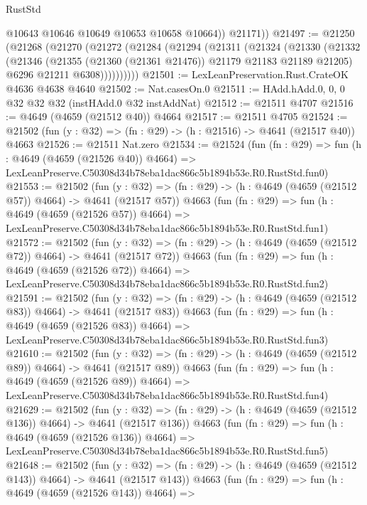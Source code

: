 \begin{lexlean}{RustStd}
\begin{coremodule}
            @10643
            @10646
            @10649
            @10653
            @10658
            @10664))
        @21171))
@21497 := @21250
    (@21268
      (@21270
        (@21272
          (@21284
            (@21294
              (@21311
                (@21324
                  (@21330
                    (@21332
                      (@21346
                        (@21355 (@21360 (@21361 @21476)) @21179 @21183 @21189 @21205)
                        @6296
                        @21211
                        @6308))))))))))
@21501 := LexLeanPreservation.Rust.CrateOK @4636 @4638 @4640
@21502 := Nat.casesOn.{0}
@21511 := HAdd.hAdd.{0, 0, 0} @32 @32 @32 (instHAdd.{0} @32 instAddNat)
@21512 := @21511 @4707
@21516 := @4649 (@4659 (@21512 @40)) @4664
@21517 := @21511 @4705
@21524 := @21502 (fun (y : @32) => (fn : @29) -> (h : @21516) -> @4641 (@21517 @40)) @4663
@21526 := @21511 Nat.zero
@21534 := @21524
    (fun (fn : @29) =>
    fun (h : @4649 (@4659 (@21526 @40)) @4664) =>
    LexLeanPreserve.C50308d34b78eba1dac866c5b1894b53e.R0.RustStd.fun0)
@21553 := @21502
    (fun (y : @32) => (fn : @29) -> (h : @4649 (@4659 (@21512 @57)) @4664) -> @4641 (@21517 @57))
    @4663
    (fun (fn : @29) =>
    fun (h : @4649 (@4659 (@21526 @57)) @4664) =>
    LexLeanPreserve.C50308d34b78eba1dac866c5b1894b53e.R0.RustStd.fun1)
@21572 := @21502
    (fun (y : @32) => (fn : @29) -> (h : @4649 (@4659 (@21512 @72)) @4664) -> @4641 (@21517 @72))
    @4663
    (fun (fn : @29) =>
    fun (h : @4649 (@4659 (@21526 @72)) @4664) =>
    LexLeanPreserve.C50308d34b78eba1dac866c5b1894b53e.R0.RustStd.fun2)
@21591 := @21502
    (fun (y : @32) => (fn : @29) -> (h : @4649 (@4659 (@21512 @83)) @4664) -> @4641 (@21517 @83))
    @4663
    (fun (fn : @29) =>
    fun (h : @4649 (@4659 (@21526 @83)) @4664) =>
    LexLeanPreserve.C50308d34b78eba1dac866c5b1894b53e.R0.RustStd.fun3)
@21610 := @21502
    (fun (y : @32) => (fn : @29) -> (h : @4649 (@4659 (@21512 @89)) @4664) -> @4641 (@21517 @89))
    @4663
    (fun (fn : @29) =>
    fun (h : @4649 (@4659 (@21526 @89)) @4664) =>
    LexLeanPreserve.C50308d34b78eba1dac866c5b1894b53e.R0.RustStd.fun4)
@21629 := @21502
    (fun (y : @32) => (fn : @29) -> (h : @4649 (@4659 (@21512 @136)) @4664) -> @4641 (@21517 @136))
    @4663
    (fun (fn : @29) =>
    fun (h : @4649 (@4659 (@21526 @136)) @4664) =>
    LexLeanPreserve.C50308d34b78eba1dac866c5b1894b53e.R0.RustStd.fun5)
@21648 := @21502
    (fun (y : @32) => (fn : @29) -> (h : @4649 (@4659 (@21512 @143)) @4664) -> @4641 (@21517 @143))
    @4663
    (fun (fn : @29) =>
    fun (h : @4649 (@4659 (@21526 @143)) @4664) =>

\end{coremodule}
\end{lexlean}
